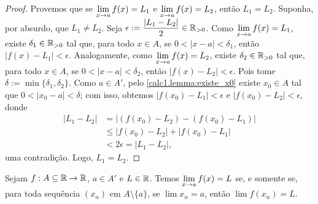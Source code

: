 \begin{proof} 
    Provemos que se $\displaystyle \lim_{x \to a} f(x) = L_1$ e $\displaystyle \lim_{x \to a} f(x) = L_2$, então $L_1 = L_2$. Suponha, por absurdo, que $L_1 \neq L_2$. Seja $\epsilon := \dfrac{|L_1 - L_2|}{2} \in \mathbb{R}_{>0}$. Como $\displaystyle \lim_{x \to a} f(x) = L_1$, existe $\delta_1 \in \mathbb{R}_{>0}$ tal que, para todo $x \in A$, se $0 < |x-a| < \delta_1$, então $|f(x) - L_1| < \epsilon$. Analogamente, como $\displaystyle \lim_{x \to a} f(x) = L_2$, existe $\delta_2 \in \mathbb{R}_{>0}$ tal que, para todo $x \in A$, se $0 < |x-a| < \delta_2$, então $|f(x) - L_2| < \epsilon$. Pois tome $\delta := \min\{\delta_1, \delta_2 \}$. Como $a \in A'$, pelo \cref{calc1.lemma:existe_x0} existe $x_0 \in A$ tal que $0<|x_0-a|<\delta$; com isso, obtemos $|f(x_0) - L_1| < \epsilon$ e $|f(x_0) - L_2| < \epsilon$, donde
        \begin{align*}
            |L_1 - L_2| &= |(f(x_0) - L_2) - (f(x_0)-L_1)| \\
            &\leq |f(x_0) - L_2| + |f(x_0)-L_1| \\
            &< 2 \epsilon = |L_1 - L_2|,
        \end{align*}
    uma contradição. Logo, $L_1 = L_2$. \blackproof
\end{proof}

\begin{theorem} \label{teo.calc1:limite_sequencial} 
    Sejam $f : A \subseteq \mathbb{R} \to \mathbb{R}$, $a \in A'$ e $L \in \mathbb{R}$. Temos $\displaystyle \lim_{x \to a} f(x) = L$ se, e somente se, para toda sequência $(x_n)$ em $A \setminus \{a\}$, se $\lim x_n = a$, então $\lim f(x_n) = L$.
\end{theorem}

